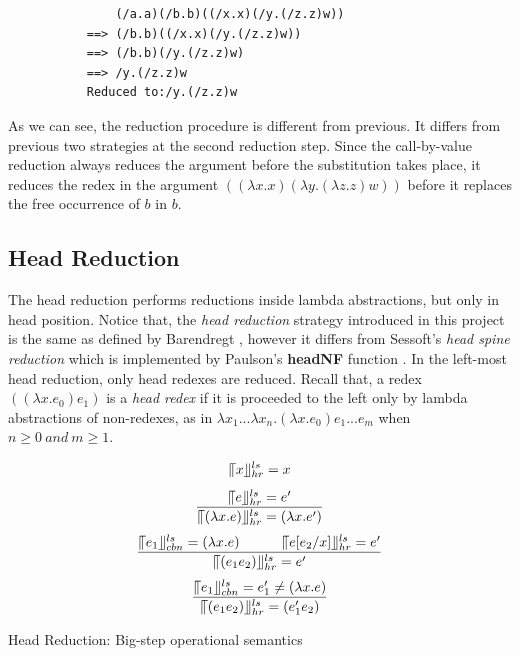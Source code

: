 \begin{verbatim}
               (/a.a)(/b.b)((/x.x)(/y.(/z.z)w))
           ==> (/b.b)((/x.x)(/y.(/z.z)w))
           ==> (/b.b)(/y.(/z.z)w)
           ==> /y.(/z.z)w
           Reduced to:/y.(/z.z)w
\end{verbatim}

As we can see, the reduction procedure is different from previous. It differs from previous two strategies at the second reduction step. Since the call-by-value reduction always reduces the argument before the substitution takes place, it reduces the redex in the argument $((\lambda x.x)(\lambda y.(\lambda z.z)w))$ before it replaces the free occurrence of $b$ in $b$.


\subsection{Head Reduction}

The head reduction performs reductions inside lambda abstractions, but only in head position. Notice that, the \textit{head reduction} strategy introduced in this project is the same as defined by Barendregt \cite{barendregt1984lambda}, however it differs from Sessoft's \cite{sestoft2002demonstrating} \textit{head spine reduction} which is implemented by Paulson's \textbf{headNF} function \cite{paulson1996ml}. In the left-most head reduction, only head redexes are reduced. Recall that, a redex $((\lambda x.e_0)e_1)$ is a \textit{head redex} if it is proceeded to the left only by lambda abstractions of non-redexes, as in $\lambda x_1...\lambda x_n.(\lambda x.e_0)e_1...e_m$ when $n \geqslant 0\ and\ m \geqslant 1$.


\begin{equation*}
\llceil x \rrfloor ^{ls} _{hr} = x
\end{equation*}
\begin{equation*}
\frac{\llceil e \rrfloor ^{ls} _{hr} = e'}{\llceil (\lambda x.e) \rrfloor ^{ls} _{hr} = (\lambda x.e')}
\end{equation*}
\begin{equation*}
\frac{\llceil e_1 \rrfloor ^{ls} _{cbn} = (\lambda x.e)\ \ \ \ \ \ \ \ \ \llceil e[e_2/x] \rrfloor ^{ls} _{hr} = e'}{\llceil (e_1e_2) \rrfloor ^{ls} _{hr} = e'}
\end{equation*}
\begin{equation*}
\frac{\llceil e_1 \rrfloor ^{ls} _{cbn} = e'_1\neq (\lambda x.e)}{\llceil (e_1e_2) \rrfloor ^{ls} _{hr}  = (e'_1e_2)}
\end{equation*}
\begin{center}
Head Reduction: Big-step operational semantics
\end{center}


